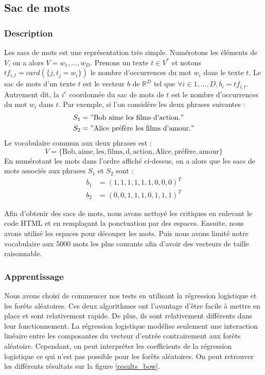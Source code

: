 \documentclass{article}
\begin{document}
\subsection{Sac de mots}

\subsubsection{Description}

Les sacs de mots \cite{Salton:1986:IMI:576628} est une représentation très simple. Numérotons les éléments de $V$, on a alors $V={w_{1}, ..., w_{D}}$. Prenons un texte $t \in V^{*}$ et notons $tf_{i,t} = card(\{j, t_{j}=w_{i}\})$ le nombre d’occurrences du mot $w_{i}$ dans le texte $t$. Le sac de mots d'un texte $t$ est le vecteur $b$ de $\mathbb{R}^{D}$ tel que $\forall i \in {1, ..., D}, b_{i} = tf_{i,t}$. Autrement dit, la $i^{e}$ coordonnée du sac de mots de $t$ est le nombre d’occurrences du mot $w_{i}$ dans $t$. Par exemple, si l'on considère les deux phrases suivantes :
\begin{align*}
S_{1} & = "\text{Bob aime les films d'action.}" \\
S_{2} & = "\text{Alice préfère les films d'amour.}"
\end{align*}
Le vocabulaire commun aux deux phrases est :
$$
V = \{\text{Bob}, \text{aime}, \text{les}, \text{films}, \text{d}, \text{action}, \text{Alice}, \text{préfère}, \text{amour}\}
$$
En numérotant les mots dans l'ordre affiché ci-dessus, on a alors que les sacs de mots associés aux phrases $S_{1}$ et $S_{2}$ sont :
\begin{align*}
b_{1} & = (1, 1, 1, 1, 1, 1, 0, 0, 0)^{T} \\
b_{2} & = (0, 0, 1, 1, 1, 0, 1, 1, 1)^{T}
\end{align*}

Afin d'obtenir des sacs de mots, nous avons nettoyé les critiques en enlevant le code HTML et en remplaçant la ponctuation par des espaces. Ensuite, nous avons utilisé les espaces pour découper les mots. Puis nous avons limité notre vocabulaire aux 5000 mots les plus courants afin d'avoir des vecteurs de taille raisonnable.

\subsubsection{Apprentissage}

Nous avons choisi de commencer nos tests en utilisant la régression logistique et les forêts aléatoires. Ces deux algorithmes ont l'avantage d'être facile à mettre en place et sont relativement rapide. De plus, ils sont relativement différents dans leur fonctionnement. La régression logistique modélise seulement une interaction linéaire entre les composantes du vecteur d'entrée contrairement aux forêts aléatoire. Cependant, on peut interpréter les coefficients de la régression logistique ce qui n'est pas possible pour les forêts aléatoires. On peut retrouver les différents résultats sur la figure \ref{results_bow}.
\end{document}
